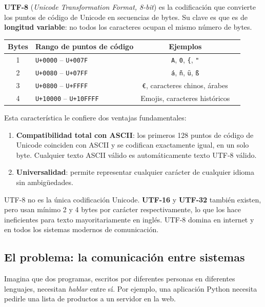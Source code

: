 \textbf{UTF-8} (\textit{Unicode Transformation Format, 8-bit}) es la codificación que convierte los puntos de código de Unicode en secuencias de bytes. Su clave es que es de \textbf{longitud variable}: no todos los caracteres ocupan el mismo número de bytes.

\begin{center}
\begin{tabular}{clcc}
\toprule
\textbf{Bytes} & \textbf{Rango de puntos de código} & \textbf{Ejemplos} \\
\midrule
1 & \texttt{U+0000} -- \texttt{U+007F} & \texttt{A}, \texttt{0}, \texttt{\{}, \texttt{"} \\
2 & \texttt{U+0080} -- \texttt{U+07FF} & \texttt{á}, \texttt{ñ}, \texttt{ü}, \texttt{ß} \\
3 & \texttt{U+0800} -- \texttt{U+FFFF} & \texttt{€}, caracteres chinos, árabes \\
4 & \texttt{U+10000} -- \texttt{U+10FFFF} & Emojis, caracteres históricos \\
\bottomrule
\end{tabular}
\end{center}

Esta característica le confiere dos ventajas fundamentales:

\begin{enumerate}
    \item \textbf{Compatibilidad total con ASCII}: los primeros 128 puntos de código de Unicode coinciden con ASCII y se codifican exactamente igual, en un solo byte. Cualquier texto ASCII válido es automáticamente texto UTF-8 válido.
    \item \textbf{Universalidad}: permite representar cualquier carácter de cualquier idioma sin ambigüedades.
\end{enumerate}

\begin{note}
UTF-8 no es la única codificación Unicode. \textbf{UTF-16} y \textbf{UTF-32} también existen, pero usan mínimo 2 y 4 bytes por carácter respectivamente, lo que los hace ineficientes para texto mayoritariamente en inglés. UTF-8 domina en internet y en todos los sistemas modernos de comunicación.
\end{note}


\subsection{El problema: la comunicación entre sistemas}

Imagina que dos programas, escritos por diferentes personas en diferentes lenguajes, necesitan \textit{hablar} entre sí. Por ejemplo, una aplicación Python necesita pedirle una lista de productos a un servidor en la web.

